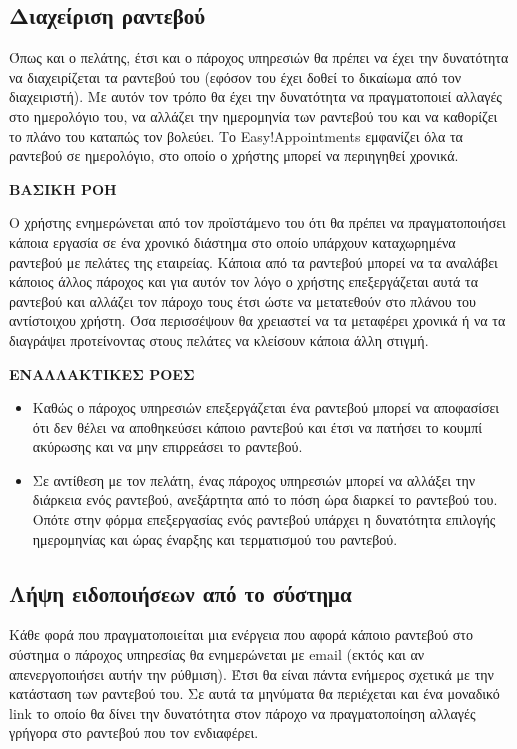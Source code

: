 \subsection {Διαχείριση ραντεβού}
Όπως και ο πελάτης, έτσι και ο πάροχος υπηρεσιών θα πρέπει να έχει την δυνατότητα να διαχειρίζεται τα ραντεβού του (εφόσον του έχει δοθεί το δικαίωμα από τον διαχειριστή). Με αυτόν τον τρόπο θα έχει την δυνατότητα να πραγματοποιεί αλλαγές στο ημερολόγιο του, να αλλάζει την ημερομηνία των ραντεβού του και να καθορίζει το πλάνο του καταπώς τον βολεύει. Το Easy!Appointments εμφανίζει όλα τα ραντεβού σε ημερολόγιο, στο οποίο ο χρήστης μπορεί να περιηγηθεί χρονικά.

\textbf{ΒΑΣΙΚΗ ΡΟΗ}

Ο χρήστης ενημερώνεται από τον προϊστάμενο του ότι θα πρέπει να πραγματοποιήσει κάποια εργασία σε ένα χρονικό διάστημα στο οποίο υπάρχουν καταχωρημένα ραντεβού με πελάτες της εταιρείας. Κάποια από τα ραντεβού μπορεί να τα αναλάβει κάποιος άλλος πάροχος και για αυτόν τον λόγο ο χρήστης επεξεργάζεται αυτά τα ραντεβού και αλλάζει τον πάροχο τους έτσι ώστε να μετατεθούν στο πλάνου του αντίστοιχου χρήστη. Όσα περισσέψουν θα χρειαστεί να τα μεταφέρει χρονικά ή να τα διαγράψει προτείνοντας στους πελάτες να κλείσουν κάποια άλλη στιγμή.

\textbf{ΕΝΑΛΛΑΚΤΙΚΕΣ ΡΟΕΣ}

\begin{itemize}
\item Καθώς ο πάροχος υπηρεσιών επεξεργάζεται ένα ραντεβού μπορεί να αποφασίσει ότι δεν θέλει να αποθηκεύσει κάποιο ραντεβού και έτσι να πατήσει το κουμπί ακύρωσης και να μην επιρρεάσει το ραντεβού.
\item Σε αντίθεση με τον πελάτη, ένας πάροχος υπηρεσιών μπορεί να αλλάξει την διάρκεια ενός ραντεβού, ανεξάρτητα από το πόση ώρα διαρκεί το ραντεβού του. Οπότε στην φόρμα επεξεργασίας ενός ραντεβού υπάρχει η δυνατότητα επιλογής ημερομηνίας και ώρας έναρξης και τερματισμού του ραντεβού.
\end{itemize}

\subsection{Λήψη ειδοποιήσεων από το σύστημα}
Κάθε φορά που πραγματοποιείται μια ενέργεια που αφορά κάποιο ραντεβού στο σύστημα ο πάροχος υπηρεσίας θα ενημερώνεται με email (εκτός και αν απενεργοποιήσει αυτήν την ρύθμιση). Έτσι θα είναι πάντα ενήμερος σχετικά με την κατάσταση των ραντεβού του. Σε αυτά τα μηνύματα θα περιέχεται και ένα μοναδικό link το οποίο θα δίνει την δυνατότητα στον πάροχο να πραγματοποίηση αλλαγές γρήγορα στο ραντεβού που τον ενδιαφέρει.

